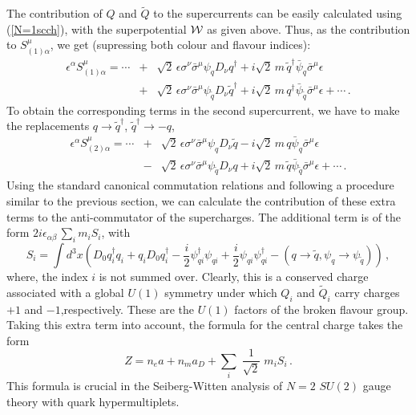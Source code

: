 The contribution of $Q$ and $\widetilde Q$ to the supercurrents can be
easily calculated using (\ref{N=1scch}), with the superpotential
${\cal W}$ as given above. Thus, as the contribution to
$S^\mu_{(1)\alpha}$, we get (supressing both colour and flavour
indices):
\begin{eqnarray}
\epsilon^\alpha S^\mu_{(1)\alpha}=\cdots&+&\sqrt{2}\,\epsilon\sigma^\nu  
\bar{\sigma}^\mu\psi_q D_\nu q^\dagger+i\sqrt{2}\,m\,
\widetilde{q}^\dagger \bar{\psi}_q\bar{\sigma}^\mu \epsilon\nonumber\\
&+& \sqrt{2}\,\epsilon\sigma^\nu\bar{\sigma}^\mu\psi_{\widetilde{q}}
D_\nu {\widetilde{q}^\dagger} + i \sqrt{2}\, m\, q^\dagger
\bar{\psi}_{\widetilde{q}} \bar{\sigma}^\mu \epsilon +\cdots\,.\nonumber
\end{eqnarray}
To obtain the corresponding terms in the second supercurrent, we have
to make the replacements $q\rightarrow\widetilde q^\dagger$, 
$\widetilde q^\dagger\rightarrow -q$,
\begin{eqnarray}
\epsilon^\alpha S^\mu_{(2)\alpha}=\cdots&+&\sqrt{2}\,\epsilon\sigma^\nu  
\bar{\sigma}^\mu\psi_q D_\nu \widetilde q - i\sqrt{2}\,m\,
q \bar{\psi}_q\bar{\sigma}^\mu \epsilon\nonumber\\
&-& \sqrt{2}\,\epsilon\sigma^\nu\bar{\sigma}^\mu\psi_{\widetilde{q}}
D_\nu q + i \sqrt{2}\, m\, \widetilde q \bar{\psi}_{\widetilde{q}} 
\bar{\sigma}^\mu \epsilon +\cdots\nonumber\,.
\end{eqnarray}
Using the standard canonical commutation relations and following a
procedure similar to the previous section, we can calculate the
contribution of these extra terms to the anti-commutator 
of the supercharges. The additional term is of the form
$2i\epsilon_{\alpha\beta}\,\sum_im_i S_i$, with
$$
S_i=\int d^3x\left(D_0q_i^\dagger q_i + q_iD_0q_i^\dagger
-\frac{i}{2}\psi^\dagger_{qi}\psi_{qi} + \frac{i}{2}\psi_{qi}
\psi^\dagger_{qi} -(q\rightarrow \widetilde q, \psi_q\rightarrow
\psi_{\widetilde q})\right)\,,
$$   
where, the index $i$ is not summed over. Clearly, this is a conserved
charge associated with a global $U(1)$ symmetry under which
$Q_i$ and $\widetilde Q_i$ carry charges $+1$ and $-1$,respectively. 
These are the $U(1)$ factors of the broken flavour group. Taking this
extra term into account, the formula for the central charge takes the
form 
\begin{equation}
Z = n_e a + n_m a_D + \sum_{i} \;\frac{1}{\sqrt{2}} \; m_i S_i \,.
\label{bps-m}
\end{equation}
This formula is crucial in the Seiberg-Witten analysis of $N = 2$
$SU(2)$ gauge theory with quark hypermultiplets.
